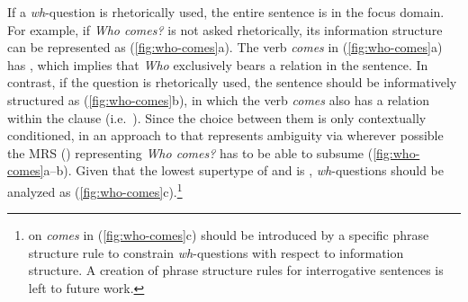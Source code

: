 If a \textit{wh}-question is rhetorically used, the entire sentence is
in the focus domain. For example, if \textit{Who comes?} is not asked
rhetorically, its information structure can be represented as
(\ref{fig:who-comes}a). The verb \textit{comes} in
(\ref{fig:who-comes}a) has , which implies that \textit{Who}
exclusively bears a  relation in the sentence. In contrast, if
the question is rhetorically used, the sentence should be
informatively structured as (\ref{fig:who-comes}b), in which the verb
\textit{comes} also has a  relation within the clause
(i.e.\ ). Since the choice between them is only
contextually conditioned, in an approach to 
that represents ambiguity via  wherever possible the
MRS (\citealt{copestake:etal:05}) representing \textit{Who comes?} has
to be able to subsume (\ref{fig:who-comes}a--b). Given that the
lowest supertype of  and  is ,
\textit{wh}-questions should be analyzed as
(\ref{fig:who-comes}c).\footnote{ on \textit{comes} in
  (\ref{fig:who-comes}c) should be introduced by a specific phrase
  structure rule to constrain \textit{wh}-questions with respect to
  information structure.  A creation of phrase structure rules for
  interrogative sentences is left to future work.}








